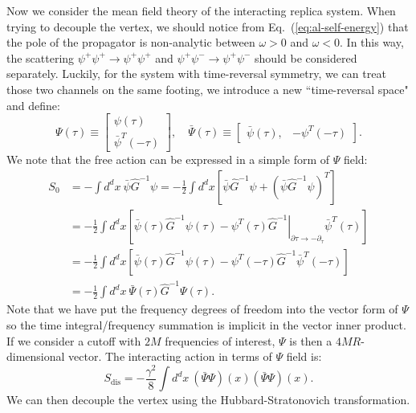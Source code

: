 \documentclass[aps,prb,superscriptaddress,nofootinbib]{revtex4}
\begin{document}
Now we consider the mean field theory of the interacting replica system.
When trying to decouple the vertex, we should notice from Eq.~(\ref{eq:al-self-energy}) that the pole of the propagator is non-analytic between $\omega>0$ and $\omega<0$.
In this way, the scattering $\psi^+ \psi^+ \rightarrow \psi^+\psi^+$ and $\psi^+ \psi^- \rightarrow \psi^+\psi^-$ should be considered separately. 
Luckily, for the system with time-reversal symmetry, we can treat those two channels on the same footing, we introduce a new ``time-reversal space" and define:
\begin{equation}
	\Psi(\tau)\equiv\begin{bmatrix}
		\psi(\tau) \\ \bar\psi^T(-\tau) 
	\end{bmatrix},\quad
	\bar\Psi(\tau) \equiv \begin{bmatrix}
		\bar\psi(\tau), & - \psi^T(-\tau)
	\end{bmatrix}.
\end{equation}
We note that the free action can be expressed in a simple form of $\Psi$ field:
\begin{equation}
\begin{aligned}
	S_0 &= -\int d^d x\ \bar\psi \hat G^{-1}\psi 
	= -\frac{1}{2}\int d^d x \left[\bar\psi \hat G^{-1}\psi + (\bar\psi \hat G^{-1}\psi)^T\right] \\
	&= -\frac{1}{2} \int d^d x \left[\bar\psi(\tau) \hat G^{-1}\psi(\tau) - \psi^T(\tau) \left. \hat G^{-1}\right|_{\partial\tau \rightarrow -\partial_\tau} \bar\psi^T(\tau)\right] \\
	&=-\frac{1}{2}\int d^d x \left[\bar\psi(\tau) \hat G^{-1}\psi(\tau) - \psi^T(-\tau) \hat G^{-1} \bar\psi^T(-\tau)\right] \\
	&= -\frac{1}{2}\int d^d x\ \bar\Psi(\tau) \hat G^{-1} \Psi(\tau).
\end{aligned}
\end{equation}
Note that we have put the frequency degrees of freedom into the vector form of $\Psi$ so the time integral/frequency summation is implicit in the vector inner product.
If we consider a cutoff with $2M$ frequencies of interest, $\Psi$ is then a $4MR$-dimensional vector.
The interacting action in terms of $\Psi$ field is:
\begin{equation}
	S_\mathrm{dis} = - \frac{\gamma^2}{8} \int d^d x\ (\bar\Psi\Psi)(x) (\bar\Psi\Psi)(x).
\end{equation}
We can then decouple the vertex using the Hubbard-Stratonovich transformation.
\end{document}
